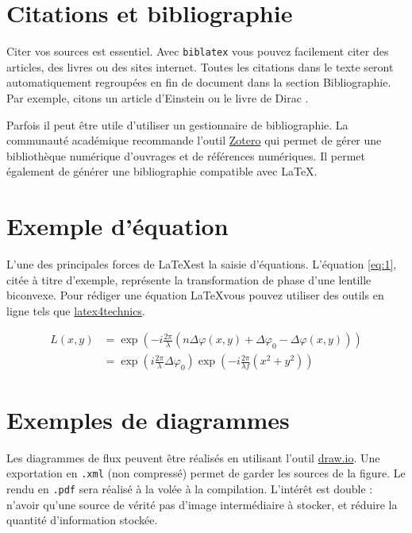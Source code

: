 \documentclass[
    iai, %
    eai, %
]{heig-tb}
\begin{document}
\section{Citations et bibliographie}
Citer vos sources est essentiel. Avec \texttt{biblatex} vous pouvez facilement citer des articles, des livres ou des sites internet. Toutes les citations dans le texte seront automatiquement regroupées en fin de document dans la section \guillemotleft Bibliographie\guillemotright. Par exemple, citons un article d'Einstein \cite{einstein} ou le livre de Dirac \cite{dirac}.

Parfois il peut être utile d'utiliser un gestionnaire de bibliographie. La communauté académique recommande l'outil \href{https://www.zotero.org/}{Zotero} qui permet de gérer une bibliothèque numérique d'ouvrages et de références numériques. Il permet également de générer une bibliographie compatible avec \LaTeX.

\section{Exemple d'équation}
L'une des principales forces de \LaTeX est la saisie d'équations. L'équation \ref{eq:1}, citée à titre d'exemple, représente la transformation de phase d'une lentille biconvexe. Pour rédiger une équation \LaTeX vous pouvez utiliser des outils en ligne tels que \href{https://www.latex4technics.com/}{latex4technics}.

\begin{equation} \label{eq:1}
  \begin{split}
    L(x,y) &= \exp\left( - i\frac{{2\pi }}{\lambda }\left( {n\Delta \varphi (x,y) + \Delta {\varphi _0} - \Delta \varphi (x,y)} \right)\right)\\
    &= {\exp\left({i\frac{{2\pi }}{\lambda }\Delta {\varphi _0}}\right)}{\exp\left({ - i\frac{{2\pi }}{{\lambda f}}({x^2} + {y^2})}\right)}
  \end{split}
\end{equation}

\section{Exemples de diagrammes}

Les diagrammes de flux peuvent être réalisés en utilisant l'outil \href{https://app.diagrams.net/}{draw.io}. Une exportation en \texttt{.xml} (non compressé) permet de garder les sources de la figure. Le rendu en \texttt{.pdf} sera réalisé à la volée à la compilation. L'intérêt est double : n'avoir qu'une source de vérité \cad pas d'image intermédiaire à stocker, et réduire la quantité d'information stockée.
\end{document}
